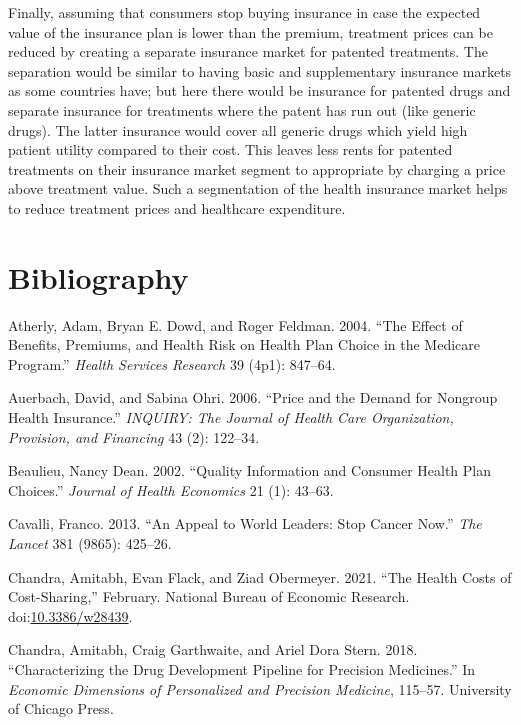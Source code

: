 \documentclass[a4paper,12pt]{article}
\begin{document}
Finally, assuming that consumers stop buying insurance in case the expected value of the insurance plan is lower than the premium, treatment prices can be reduced by creating a separate insurance market for patented treatments. The separation would be similar to having basic and supplementary insurance markets as some countries have; but here there would be insurance for patented drugs and separate insurance for treatments  where the patent has run out (like generic drugs). The latter insurance would cover all generic drugs which yield high patient utility compared to their cost. This leaves less rents for patented treatments on their insurance market segment to appropriate by charging a price above treatment value. Such a segmentation of the health insurance market helps to reduce treatment prices and healthcare expenditure.

\section{Bibliography}
\label{sec:orgdc77305}

\hypertarget{citeproc_bib_item_1}{Atherly, Adam, Bryan E. Dowd, and Roger Feldman. 2004. “The Effect of Benefits, Premiums, and Health Risk on Health Plan Choice in the Medicare Program.” \textit{Health Services Research} 39 (4p1): 847–64.}

\hypertarget{citeproc_bib_item_2}{Auerbach, David, and Sabina Ohri. 2006. “Price and the Demand for Nongroup Health Insurance.” \textit{INQUIRY: The Journal of Health Care Organization, Provision, and Financing} 43 (2): 122–34.}

\hypertarget{citeproc_bib_item_3}{Beaulieu, Nancy Dean. 2002. “Quality Information and Consumer Health Plan Choices.” \textit{Journal of Health Economics} 21 (1): 43–63.}

\hypertarget{citeproc_bib_item_4}{Cavalli, Franco. 2013. “An Appeal to World Leaders: Stop Cancer Now.” \textit{The Lancet} 381 (9865): 425–26.}

\hypertarget{citeproc_bib_item_5}{Chandra, Amitabh, Evan Flack, and Ziad Obermeyer. 2021. “The Health Costs of Cost-Sharing,” February. National Bureau of Economic Research. doi:\href{https://doi.org/10.3386/w28439}{10.3386/w28439}.}

\hypertarget{citeproc_bib_item_6}{Chandra, Amitabh, Craig Garthwaite, and Ariel Dora Stern. 2018. “Characterizing the Drug Development Pipeline for Precision Medicines.” In \textit{Economic Dimensions of Personalized and Precision Medicine}, 115–57. University of Chicago Press.}
\end{document}
